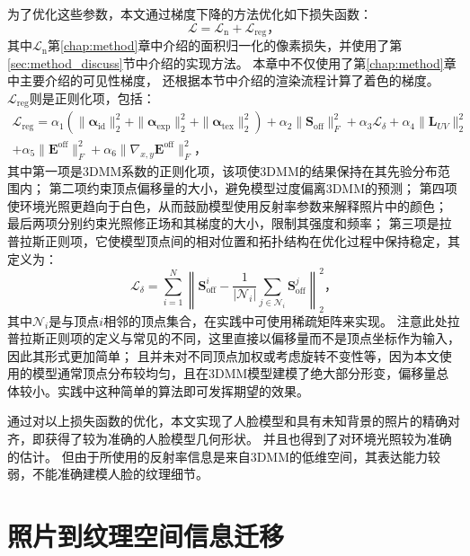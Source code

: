 为了优化这些参数，本文通过梯度下降的方法优化如下损失函数：
\begin{equation}
    \mathcal{L} = \mathcal{L}_\mathrm{n} + \mathcal{L}_\mathrm{reg}
    \text{，}
\end{equation}
其中$\mathcal{L}_\mathrm{n}$第\ref{chap:method}章中介绍的面积归一化的像素损失，并使用了第\ref{sec:method_discuss}节中介绍的实现方法。
本章中不仅使用了第\ref{chap:method}章中主要介绍的可见性梯度，
还根据本节中介绍的渲染流程计算了着色的梯度。
$\mathcal{L}_\mathrm{reg}$则是正则化项，包括：
\begin{equation}
\begin{split}
\mathcal{L}_\mathrm{reg} = \alpha_1\left(\| \mathbf{\alpha}_\mathrm{id} \|_2^2 +
    \| \mathbf{\alpha}_\mathrm{exp} \|_2^2 +
    \| \mathbf{\alpha}_\mathrm{tex} \|_2^2\right) +
    \alpha_2 \| \mathbf{S}_\mathrm{off} \|_F^2 +
    \alpha_3 \mathcal{L}_\delta +
    \alpha_4 \| \mathbf{L}_{UV} \|_2^2 \\
    + \alpha_5 \| \mathbf{E}^\mathrm{off} \|_F^2 +
    \alpha_6 \| \nabla_{x,y} \mathbf{E}^\mathrm{off} \|_F^2
    \text{，}
\end{split}
\end{equation}
其中第一项是3DMM系数的正则化项，该项使3DMM的结果保持在其先验分布范围内；
第二项约束顶点偏移量的大小，避免模型过度偏离3DMM的预测；
第四项使环境光照更趋向于白色，从而鼓励模型使用反射率参数来解释照片中的颜色；
最后两项分别约束光照修正场和其梯度的大小，限制其强度和频率；
第三项是拉普拉斯正则项，它使模型顶点间的相对位置和拓扑结构在优化过程中保持稳定，其定义为：
\begin{equation}
    \mathcal{L}_\delta = \sum_{i=1}^N \left\|\mathbf{S}_\mathrm{off}^i - \frac{1}{|\mathcal{N}_i|}\sum_{j\in\mathcal{N}_i} \mathbf{S}_\mathrm{off}^j\right\|_2^2
    \text{，}
\end{equation}
其中$\mathcal{N}_i$是与顶点$i$相邻的顶点集合，在实践中可使用稀疏矩阵来实现。
注意此处拉普拉斯正则项的定义与常见的不同，这里直接以偏移量而不是顶点坐标作为输入，因此其形式更加简单；
且并未对不同顶点加权或考虑旋转不变性等，因为本文使用的模型通常顶点分布较均匀，且在3DMM模型建模了绝大部分形变，偏移量总体较小。实践中这种简单的算法即可发挥期望的效果。

通过对以上损失函数的优化，本文实现了人脸模型和具有未知背景的照片的精确对齐，即获得了较为准确的人脸模型几何形状。
并且也得到了对环境光照较为准确的估计。
但由于所使用的反射率信息是来自3DMM的低维空间，其表达能力较弱，不能准确建模人脸的纹理细节。

\section{照片到纹理空间信息迁移}
\label{sec:method_photo2tex}


